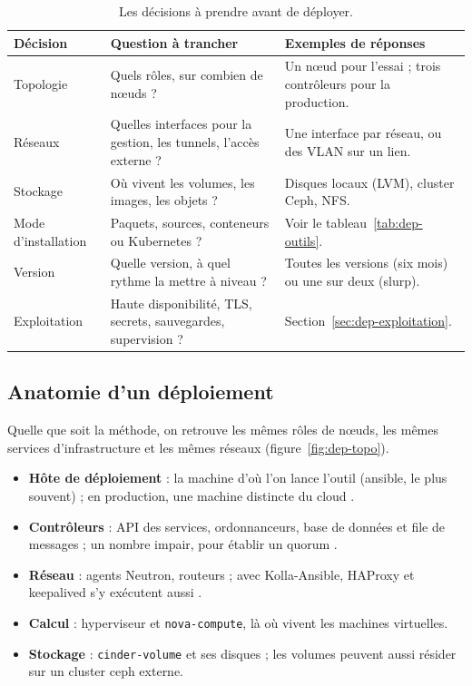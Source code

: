 \begin{table}[!ht]
\centering
\renewcommand{\arraystretch}{1.3}
\begin{tabular}{@{}>{\raggedright\arraybackslash}p{3.0cm}>{\raggedright\arraybackslash}p{6.3cm}>{\raggedright\arraybackslash}p{6.1cm}@{}}
\toprule
\textbf{Décision} & \textbf{Question à trancher} & \textbf{Exemples de réponses} \\
\midrule
Topologie & Quels rôles, sur combien de nœuds ? & Un nœud pour l'essai ; trois contrôleurs pour la production. \\
Réseaux & Quelles interfaces pour la gestion, les tunnels, l'accès externe ? & Une interface par réseau, ou des VLAN sur un lien. \\
Stockage & Où vivent les volumes, les images, les objets ? & Disques locaux (LVM), cluster Ceph, NFS. \\
Mode d'installation & Paquets, sources, conteneurs ou Kubernetes ? & Voir le tableau~\ref{tab:dep-outils}. \\
Version & Quelle version, à quel rythme la mettre à niveau ? & Toutes les versions (six mois) ou une sur deux (\gls{slurp}). \\
Exploitation & Haute disponibilité, TLS, secrets, sauvegardes, supervision ? & Section~\ref{sec:dep-exploitation}. \\
\bottomrule
\end{tabular}
\caption{Les décisions à prendre avant de déployer.}
\label{tab:dep-decisions}
\end{table}

\subsection{Anatomie d'un déploiement}\label{sec:dep-anatomie}

Quelle que soit la méthode, on retrouve les mêmes rôles de nœuds, les mêmes services d'infrastructure et les mêmes réseaux
(figure~\ref{fig:dep-topo}).

\begin{itemize}
  \item \textbf{Hôte de déploiement} : la machine d'où l'on lance l'outil (\gls{ansible}, le plus souvent) ; en production, une machine
        distincte du cloud \parencite{osa-deploy-host,kolla-ansible-production}.
  \item \textbf{Contrôleurs} : API des services, ordonnanceurs, base de données et file de messages ; un nombre impair, pour
        établir un quorum \parencite{kolla-ansible-production}.
  \item \textbf{Réseau} : agents Neutron, routeurs ; avec Kolla-Ansible, HAProxy et keepalived s'y exécutent aussi
        \parencite{kolla-ansible-production}.
  \item \textbf{Calcul} : hyperviseur et \texttt{nova-compute}, là où vivent les machines virtuelles.
  \item \textbf{Stockage} : \texttt{cinder-volume} et ses disques ; les volumes peuvent aussi résider sur un cluster \gls{ceph} externe.
\end{itemize}

